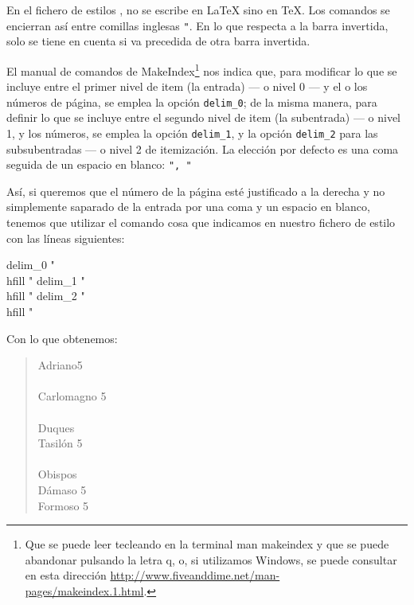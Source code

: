 \begin{attention}
En el fichero de estilos , no se escribe en \LaTeX{} sino en \TeX . Los comandos se encierran así entre comillas inglesas \verb|"|. En lo que respecta a la barra invertida, solo se tiene en cuenta si va precedida de otra barra invertida.
\end{attention}

El manual de comandos de MakeIndex\footnote{Que se puede leer tecleando en la terminal {\ttfamily man makeindex} y que se puede abandonar pulsando la letra  {\ttfamily q}, o, si utilizamos Windows, se puede consultar en esta dirección \url{http://www.fiveanddime.net/man-pages/makeindex.1.html}.} nos indica que, para modificar lo que se incluye entre el primer nivel de item (la entrada) --- o nivel 0 --- y el o los números de página, se emplea la opción \verb|delim_0|; de la misma manera, para definir lo que se incluye entre el segundo nivel de item (la subentrada) --- o nivel 1, y los números, se emplea la opción \verb+delim_1+, y la opción \verb|delim_2| para las subsubentradas --- o nivel 2 de itemización. La elección por defecto es una coma seguida de un espacio en blanco: \verb|", "|

Así, si queremos que el número de la página esté justificado a la derecha y no simplemente saparado de la entrada por una coma y un espacio en blanco, tenemos que utilizar el comando  cosa que indicamos en nuestro fichero de estilo con las líneas siguientes:

\begin{latexcode}
delim_0 "\\hfill "
delim_1 "\\hfill "
delim_2 "\\hfill "
\end{latexcode}

Con lo que obtenemos: 

\begin{quotation}

\noindent Adriano\hfill 5 \\
\\
Carlomagno \hfill 5 \\
\\
Duques \\
\hspace*{1em} Tasilón \hfill 5\\
\\
Obispos \\
\hspace*{1em} Dámaso \hfill 5\\
\hspace*{1em} Formoso \hfill  5
\end{quotation}

